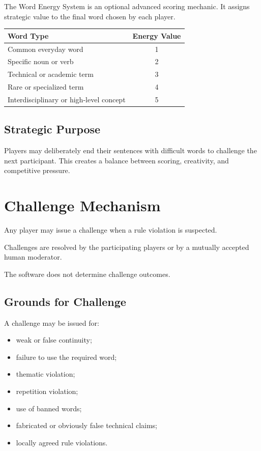 \documentclass[11pt,a4paper]{article}
\begin{document}
The Word Energy System is an optional advanced scoring mechanic. It assigns strategic value to the final word chosen by each player.

\begin{center}
\begin{tabular}{lc}
\toprule
\textbf{Word Type} & \textbf{Energy Value} \\
\midrule
Common everyday word & 1 \\
Specific noun or verb & 2 \\
Technical or academic term & 3 \\
Rare or specialized term & 4 \\
Interdisciplinary or high-level concept & 5 \\
\bottomrule
\end{tabular}
\end{center}

\subsection{Strategic Purpose}

Players may deliberately end their sentences with difficult words to challenge the next participant. This creates a balance between scoring, creativity, and competitive pressure.

\section{Challenge Mechanism}

Any player may issue a challenge when a rule violation is suspected.

Challenges are resolved by the participating players or by a mutually accepted human moderator.

The software does not determine challenge outcomes.

\subsection{Grounds for Challenge}

A challenge may be issued for:

\begin{itemize}
    \item weak or false continuity;
    \item failure to use the required word;
    \item thematic violation;
    \item repetition violation;
    \item use of banned words;
    \item fabricated or obviously false technical claims;
    \item locally agreed rule violations.
\end{itemize}
\end{document}
